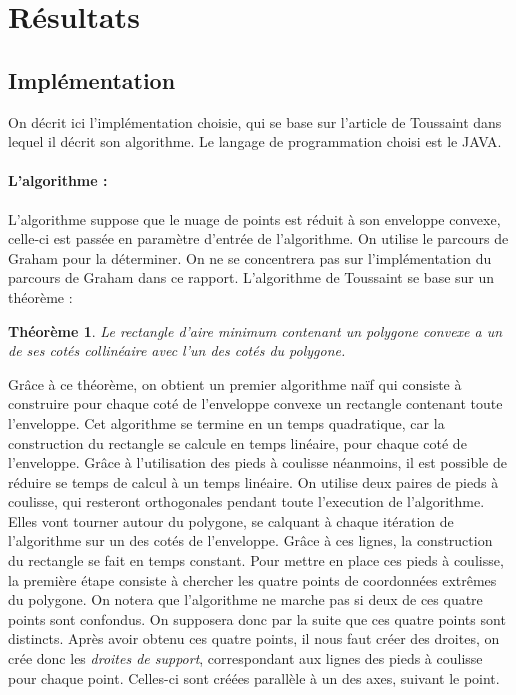 \documentclass[12pt]{report}
\newtheorem{theoremA}{Théorème}
\begin{document}
\section{Résultats}
\subsection{Implémentation}
On décrit ici l'implémentation choisie, qui se base sur l'article de Toussaint dans lequel il décrit son algorithme. Le langage de programmation choisi est le JAVA.
\paragraph{L'algorithme : }
L'algorithme suppose que le nuage de points est réduit à son enveloppe convexe, celle-ci est passée en paramètre d'entrée de l'algorithme. On utilise le parcours de Graham pour la déterminer. On ne se concentrera pas sur l'implémentation du parcours de Graham dans ce rapport. L'algorithme de Toussaint se base sur un théorème : 
\begin{theoremA}Le rectangle d'aire minimum contenant un polygone convexe a un de ses cotés collinéaire avec l'un des cotés du polygone.
\end{theoremA}
Grâce à ce théorème, on obtient un premier algorithme naïf qui consiste à construire pour chaque coté de l'enveloppe convexe un rectangle contenant toute l'enveloppe. Cet algorithme se termine en un temps quadratique, car la construction du rectangle se calcule en temps linéaire, pour chaque coté de l'enveloppe. Grâce à l'utilisation des pieds à coulisse néanmoins, il est possible de réduire se temps de calcul à un temps linéaire. 
On utilise deux paires de pieds à coulisse, qui resteront orthogonales pendant toute l'execution de l'algorithme. Elles vont tourner autour du polygone, se calquant à chaque itération de l'algorithme  sur un des cotés de l'enveloppe. Grâce à ces lignes, la construction du rectangle se fait en temps constant. 
Pour mettre en place ces pieds à coulisse, la première étape consiste à chercher les quatre points de coordonnées extrêmes du polygone. On notera que l'algorithme ne marche pas si deux de ces quatre points sont confondus. On supposera donc par la suite que ces quatre points sont distincts. Après avoir obtenu ces quatre points, il nous faut créer des droites, on crée donc les \emph{droites de support}, correspondant aux lignes des pieds à coulisse pour chaque point. Celles-ci sont créées parallèle à un des axes, suivant le point. 
\end{document}
